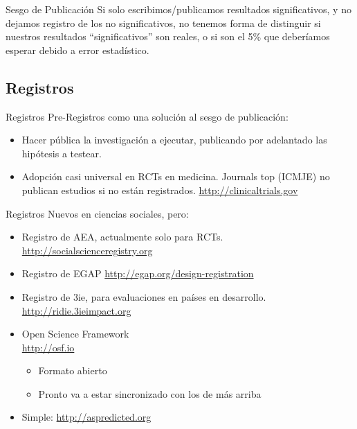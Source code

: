 \documentclass{beamer}
\begin{document}
\begin {frame}{Sesgo de Publicación}
Si solo escribimos/publicamos resultados significativos, y no dejamos registro de los no significativos, no tenemos forma de distinguir si nuestros resultados ``significativos'' son reales, o si son el 5\% que deberíamos esperar debido a error estadístico. 

\end{frame}

\subsection* {Registros}
\begin{frame}{Registros}
Pre-Registros como una solución al sesgo de publicación:
 \begin{itemize}
  \item
  Hacer pública la investigación a ejecutar, publicando por adelantado las hipótesis a testear.
  \item

   Adopción casi universal en RCTs en medicina. Journals top (ICMJE) no publican estudios si no están registrados. \url{http://clinicaltrials.gov}
   
  
\end{itemize}
\end{frame}

\begin{frame}{Registros}
Nuevos en ciencias sociales, pero: 
   \begin{itemize}[<.->]
   \item   	
   	Registro de AEA, actualmente solo para RCTs. \url{http://socialscienceregistry.org}
   \item
    Registro de EGAP  \url{http://egap.org/design-registration}
   \item 
    Registro de 3ie, para evaluaciones en países en desarrollo. \url{http://ridie.3ieimpact.org}
   \item
   	Open Science Framework\\ \url{http://osf.io}
   	\begin{itemize}
   	\item
   	Formato abierto
   	\item
   	Pronto va a estar sincronizado con los de más arriba
   	\end{itemize}
   	\item Simple: \url{http://aspredicted.org}
   \end{itemize}
 
\end{frame}
\end{document}
